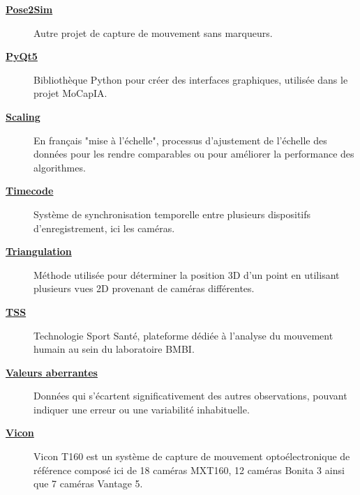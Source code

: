 \begin{description}
    \item[\textbf{\underline{Pose2Sim}}] 
    Autre projet de capture de mouvement sans marqueurs.

    \item[\textbf{\underline{PyQt5}}] 
    Bibliothèque Python pour créer des interfaces graphiques, utilisée dans le projet MoCapIA.

    \item[\textbf{\underline{Scaling}}] 
    En français "mise à l'échelle", processus d'ajustement de l'échelle des données pour les rendre comparables ou pour améliorer la performance des algorithmes.

    \item[\textbf{\underline{Timecode}}] 
    Système de synchronisation temporelle entre plusieurs dispositifs d'enregistrement, ici les caméras.

    \item[\textbf{\underline{Triangulation}}] 
    Méthode utilisée pour déterminer la position 3D d'un point en utilisant plusieurs vues 2D provenant de caméras différentes.

    \item[\textbf{\underline{TSS}}] 
    Technologie Sport Santé, plateforme dédiée à l'analyse du mouvement humain au sein du laboratoire BMBI.

    \item[\textbf{\underline{Valeurs aberrantes}}] 
    Données qui s'écartent significativement des autres observations, pouvant indiquer une erreur ou une variabilité inhabituelle.

    \item[\textbf{\underline{Vicon}}] 
    Vicon T160 est un système de capture de mouvement optoélectronique de référence composé ici de 18 caméras MXT160, 12 caméras Bonita 3 ainsi que 7 caméras Vantage 5.

\end{description}